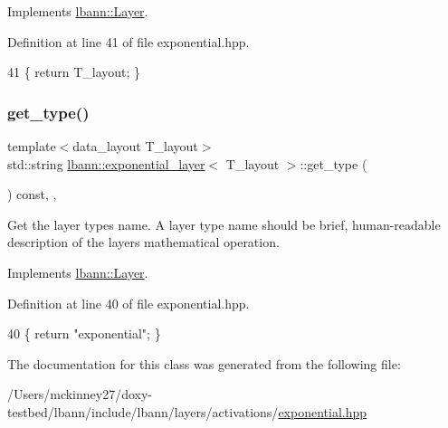 Implements \hyperlink{classlbann_1_1Layer_a5dfb66e81fc085997402a5e2241316bd}{lbann\+::\+Layer}.



Definition at line 41 of file exponential.\+hpp.


\begin{DoxyCode}
41 \{ \textcolor{keywordflow}{return} T\_layout; \}
\end{DoxyCode}
\mbox{\label{classlbann_1_1exponential__layer_a1af0f57aab2940d09bd1f0ba671fc171}} 
\subsubsection{\texorpdfstring{get\+\_\+type()}{get\_type()}}
{\footnotesize\ttfamily template$<$data\+\_\+layout T\+\_\+layout$>$ \\
std\+::string \hyperlink{classlbann_1_1exponential__layer}{lbann\+::exponential\+\_\+layer}$<$ T\+\_\+layout $>$\+::get\+\_\+type (\begin{DoxyParamCaption}{ }\end{DoxyParamCaption}) const\hspace{0.3cm}{\ttfamily [inline]}, {\ttfamily [override]}, {\ttfamily [virtual]}}

Get the layer type\textquotesingle{}s name. A layer type name should be brief, human-\/readable description of the layer\textquotesingle{}s mathematical operation. 

Implements \hyperlink{classlbann_1_1Layer_a0fa0ea9160b490c151c0a17fde4f7239}{lbann\+::\+Layer}.



Definition at line 40 of file exponential.\+hpp.


\begin{DoxyCode}
40 \{ \textcolor{keywordflow}{return} \textcolor{stringliteral}{"exponential"}; \}
\end{DoxyCode}


The documentation for this class was generated from the following file\+:\begin{DoxyCompactItemize}
\item 
/\+Users/mckinney27/doxy-\/testbed/lbann/include/lbann/layers/activations/\hyperlink{exponential_8hpp}{exponential.\+hpp}\end{DoxyCompactItemize}
